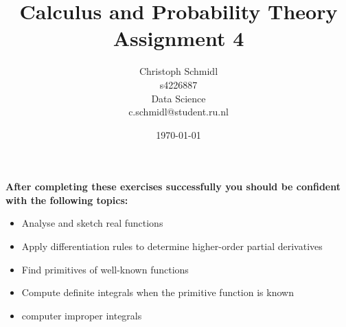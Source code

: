 \documentclass[a4paper]{article}
\title{Calculus and Probability Theory\\ Assignment 4}
\author{Christoph Schmidl\\
s4226887\\
Data Science\\
c.schmidl@student.ru.nl\\}
\date{\today}
\begin{document}
\maketitle





\textbf{After completing these exercises successfully you should be confident with the following topics:}

\begin{itemize}
	\item Analyse and sketch real functions
	\item Apply differentiation rules to determine higher-order partial derivatives
	\item Find primitives of well-known functions
	\item Compute definite integrals when the primitive function is known
	\item computer improper integrals
\end{itemize}
\vspace{1em}
\end{document}
